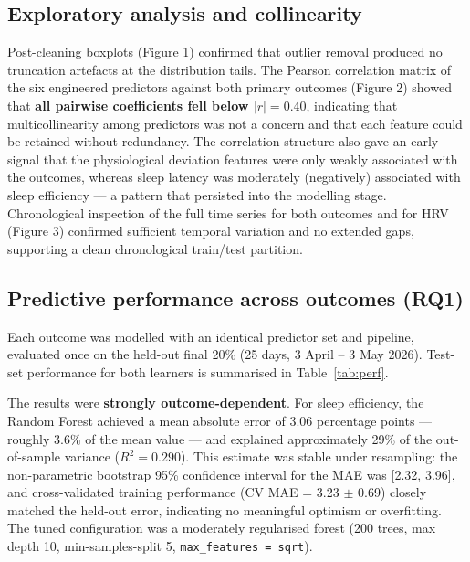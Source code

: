 \documentclass[fleqn,10pt]{wlscirep}
\begin{document}
\subsection*{Exploratory analysis and collinearity}

Post-cleaning boxplots (Figure 1) confirmed that outlier removal produced no truncation artefacts at the distribution tails. The Pearson correlation matrix of the six engineered predictors against both primary outcomes (Figure 2) showed that \textbf{all pairwise coefficients fell below $|r| = 0.40$}, indicating that multicollinearity among predictors was not a concern and that each feature could be retained without redundancy. The correlation structure also gave an early signal that the physiological deviation features were only weakly associated with the outcomes, whereas sleep latency was moderately (negatively) associated with sleep efficiency --- a pattern that persisted into the modelling stage. Chronological inspection of the full time series for both outcomes and for HRV (Figure 3) confirmed sufficient temporal variation and no extended gaps, supporting a clean chronological train/test partition.

\subsection*{Predictive performance across outcomes (RQ1)}

Each outcome was modelled with an identical predictor set and pipeline, evaluated once on the held-out final 20\% (25 days, 3 April -- 3 May 2026). Test-set performance for both learners is summarised in Table~\ref{tab:perf}.

The results were \textbf{strongly outcome-dependent}. For sleep efficiency, the Random Forest achieved a mean absolute error of 3.06 percentage points --- roughly 3.6\% of the mean value --- and explained approximately 29\% of the out-of-sample variance ($R^2 = 0.290$). This estimate was stable under resampling: the non-parametric bootstrap 95\% confidence interval for the MAE was [2.32, 3.96], and cross-validated training performance (CV MAE = 3.23 $\pm$ 0.69) closely matched the held-out error, indicating no meaningful optimism or overfitting. The tuned configuration was a moderately regularised forest (200 trees, max depth 10, min-samples-split 5, \texttt{max\_features = sqrt}).
\end{document}
